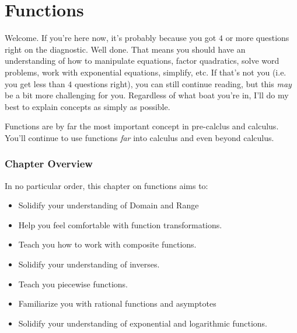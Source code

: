 \part{Functions}
Welcome. If you're here now, it's probably because you got $4$ or more questions right on the diagnostic. Well done. That means you should have an understanding of how to manipulate equations, factor quadratics, solve word problems, work with exponential equations, simplify, etc. If that's not you (i.e. you get less than $4$ questions right), you can still continue reading, but this \textit{may} be a bit more challenging for you. Regardless of what boat you're in, I'll do my best to explain concepts as simply as possible.

Functions are by far the most important concept in pre-calclus and calculus. You'll continue to use functions \textit{far} into calculus and even beyond calculus.

\section*{Chapter Overview}
In no particular order, this chapter on functions aims to:
\begin{itemize}
    \item Solidify your understanding of Domain and Range
    \item Help you feel comfortable with function transformations.
    \item Teach you how to work with composite functions.
    \item Solidify your understanding of inverses.
    \item Teach you piecewise functions.
    \item Familiarize you with rational functions and asymptotes
    \item Solidify your understanding of exponential and logarithmic functions.
\end{itemize}